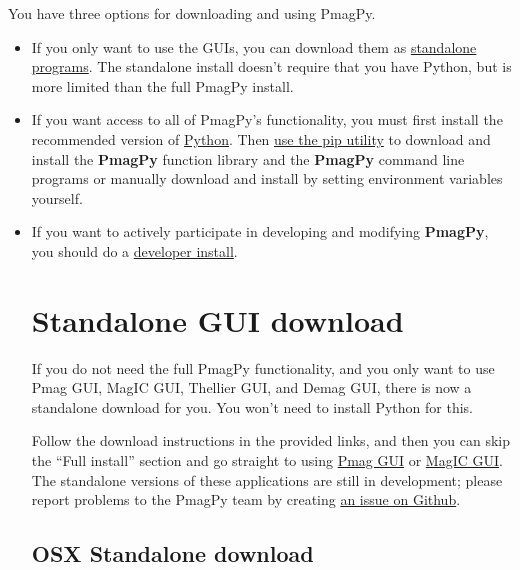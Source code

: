\documentclass[11pt]{book}
\begin{document}
{%
You have three options for downloading and using PmagPy.

\begin{itemize}
  \item If you only want to use the GUIs, you can download them as  \href{#standalone}{standalone programs}.  The standalone install doesn't require that you have Python, but is more limited than the full PmagPy install.

  \item If you want access to all of PmagPy's functionality, you must first install the recommended version of
    \href{#getting_python}{ Python}.  Then  \href{#pip_install}{use the pip utility} to download and install the {\bf PmagPy} function library and the {\bf PmagPy} command line programs or manually download and install by setting environment variables yourself.

   \item If you want to actively participate in developing and modifying {\bf PmagPy}, you should do a \href{#developer_install}{developer install}.

\section{Standalone GUI download}

If you do not need the full PmagPy functionality, and you only want to use Pmag GUI, MagIC GUI, Thellier GUI, and Demag GUI, there is now a standalone download for you.  You won't need to install Python for this.

\noindent Follow the download instructions in the provided links, and then you can skip the ``Full install'' section and go straight to using \href{#pmag_gui.py}{Pmag GUI} or \href{#magic_gui.py}{MagIC GUI}.  The standalone versions of these applications are still in development; please report problems to the PmagPy team by creating \href{https://github.com/PmagPy/PmagPy/issues/}{an issue on Github}.

\subsection{OSX Standalone download}


\end{itemize}}
\end{document}
